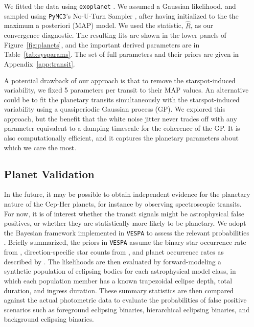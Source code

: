\documentclass[12pt,twocolumn,tighten,linenumbers]{aastex63}
\begin{document}
We fitted the data using \texttt{exoplanet}
\citep{exoplanet:exoplanet}.  We assumed a Gaussian likelihood, and
sampled using \texttt{PyMC3}'s No-U-Turn Sampler
\citep{hoffman_no-u-turn_2014}, after having initialized to the the
maximum a posteriori (MAP) model.  We used the
\citet{gelman_inference_1992} statistic, $\hat{R}$, as our convergence
diagnostic.  The resulting fits are shown in the lower panels of
Figure~\ref{fig:planets}, and the important derived parameters are in
Table~\ref{tab:sysparams}.  The set of full parameters and their
priors are given in Appendix~\ref{app:transit}.

A potential drawback of our approach is that to remove
the starspot-induced variability, we fixed 5 
parameters per transit to their MAP values.
An alternative could be to fit the
planetary transits simultaneously with the starspot-induced
variability using a quasiperiodic Gaussian process (GP).  We explored
this approach, but  the benefit that the white noise jitter never
trades off with any parameter equivalent to a damping timescale for
the coherence of the GP.  It is also computationally efficient, and it
captures the planetary parameters about which we care the most.


\subsection{Planet Validation}
\label{subsec:validation}

In the future, it may be possible to obtain independent evidence for
the planetary nature of the Cep-Her planets, for instance by observing
spectroscopic transits.  For now,
it is of interest whether the transit signals might be astrophysical
false positives, or whether they are statistically more likely to be
planetary.  We adopt the Bayesian framework implemented in
\texttt{VESPA} to assess the relevant probabilities
\citep{morton_efficient_2012,vespa_2015}.  Briefly summarized, the
priors in \texttt{VESPA} assume the binary star occurrence rate from
\citet{raghavan_survey_2010}, direction-specific star counts from
\citet{girardi_star_2005}, and planet occurrence rates as described by
\citet[][Section~3.4]{morton_efficient_2012}.  The likelihoods are
then evaluated by forward-modeling a synthetic population of eclipsing
bodies for each astrophysical model class, in which each population
member has a known trapezoidal eclipse depth, total duration, and
ingress duration.  These summary statistics are then compared against
the actual photometric data to evaluate the probabilities of false
positive scenarios such as foreground eclipsing binaries, hierarchical
eclipsing binaries, and background eclipsing binaries.
\end{document}
